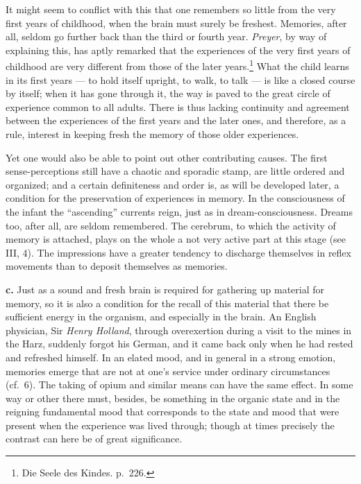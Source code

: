 \documentclass[12pt,a4paper]{book}
\newcommand{\opage}[1]{\marginnote{\footnotesize\textit{[#1]}}}
\begin{document}
It might seem to conflict with this that one remembers so little from the
very first years of childhood, when the brain must surely be freshest.
Memories, after all, seldom go further back than the third or fourth year.
\emph{Preyer}, by way of explaining this, has aptly remarked that the
experiences of the very first years of childhood are very different from
those of the later
years.\footnote{Die Seele des Kindes. p.~226.} What the child learns in its
first years --- to hold itself upright, to walk, to talk --- is like a
closed course by itself; when it has gone through it, the way is paved to
the great circle of experience common to all adults. There is thus lacking
continuity and agreement between the experiences of the first years and the
later ones, and therefore, as a rule, interest in keeping fresh the memory
of those older experiences.

Yet one would also be able to point out other contributing causes. The
first sense-perceptions still have a chaotic and sporadic stamp, are little
ordered and organized; and a certain definiteness and order is, as will be
developed later, a condition for the preservation of experiences in memory.
In the consciousness of the infant the ``ascending'' currents reign, just
as in dream-consciousness. Dreams too, after all, are seldom remembered.
The cerebrum, to which the activity of memory is attached, plays on the
whole a not very active part at this stage (see III, 4). The impressions
have a greater tendency to discharge themselves in reflex movements than
to deposit themselves as memories.

\textbf{c.} Just as a sound and fresh brain is required for gathering up
material for memory, so it is also a condition for the recall of this
material that there be sufficient energy in the organism, and especially
in the brain. An English physician, Sir \emph{Henry Holland}, through
overexertion during a visit to the mines in the Harz, suddenly forgot his
German, and it came back only when he had rested and refreshed himself. In
an elated mood, and in general in a strong emotion,
\opage{183}memories emerge that are not at one's service under ordinary
circumstances (cf.\ 6). The taking of opium and similar means can have the
same effect. In some way or other there must, besides, be something in the
organic state and in the reigning fundamental mood that corresponds to the
state and mood that were present when the experience was lived through;
though at times precisely the contrast can here be of great significance.
\end{document}
